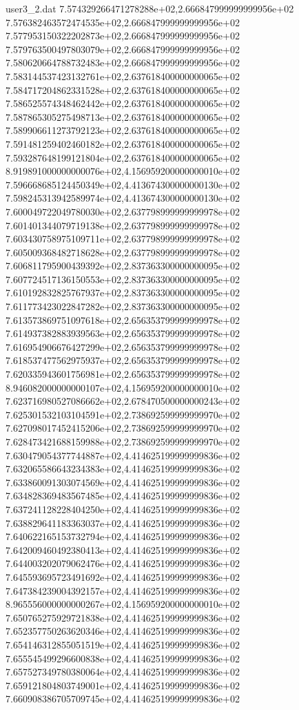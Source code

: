 \begin{filecontents}{user3_2.dat}
7.574329266471278288e+02,2.666847999999999956e+02
7.576382463572474535e+02,2.666847999999999956e+02
7.577953150322202873e+02,2.666847999999999956e+02
7.579763500497803079e+02,2.666847999999999956e+02
7.580620664788732483e+02,2.666847999999999956e+02
7.583144537423132761e+02,2.637618400000000065e+02
7.584717204862331528e+02,2.637618400000000065e+02
7.586525574348462442e+02,2.637618400000000065e+02
7.587865305275498713e+02,2.637618400000000065e+02
7.589906611273792123e+02,2.637618400000000065e+02
7.591481259402460182e+02,2.637618400000000065e+02
7.593287648199121804e+02,2.637618400000000065e+02
8.919891000000000076e+02,4.156959200000000010e+02
7.596668685124450349e+02,4.413674300000000130e+02
7.598245313942589974e+02,4.413674300000000130e+02
7.600049722049780030e+02,2.637798999999999978e+02
7.601401344079719138e+02,2.637798999999999978e+02
7.603430758975109711e+02,2.637798999999999978e+02
7.605009368482718628e+02,2.637798999999999978e+02
7.606811795900439392e+02,2.837363300000000095e+02
7.607724517136150553e+02,2.837363300000000095e+02
7.610192832825767937e+02,2.837363300000000095e+02
7.611773423022847282e+02,2.837363300000000095e+02
7.613573869751097618e+02,2.656353799999999978e+02
7.614937382883939563e+02,2.656353799999999978e+02
7.616954906676427299e+02,2.656353799999999978e+02
7.618537477562975937e+02,2.656353799999999978e+02
7.620335943601756981e+02,2.656353799999999978e+02
8.946082000000000107e+02,4.156959200000000010e+02
7.623716980527086662e+02,2.678470500000000243e+02
7.625301532103104591e+02,2.738692599999999970e+02
7.627098017452415206e+02,2.738692599999999970e+02
7.628473421688159988e+02,2.738692599999999970e+02
7.630479054377744887e+02,4.414625199999999836e+02
7.632065586643234383e+02,4.414625199999999836e+02
7.633860091303074569e+02,4.414625199999999836e+02
7.634828369483567485e+02,4.414625199999999836e+02
7.637241128228404250e+02,4.414625199999999836e+02
7.638829641183363037e+02,4.414625199999999836e+02
7.640622165153732794e+02,4.414625199999999836e+02
7.642009460492380413e+02,4.414625199999999836e+02
7.644003202079062476e+02,4.414625199999999836e+02
7.645593695723491692e+02,4.414625199999999836e+02
7.647384239004392157e+02,4.414625199999999836e+02
8.965556000000000267e+02,4.156959200000000010e+02
7.650765275929721838e+02,4.414625199999999836e+02
7.652357750263620346e+02,4.414625199999999836e+02
7.654146312855051519e+02,4.414625199999999836e+02
7.655545499296600838e+02,4.414625199999999836e+02
7.657527349780380064e+02,4.414625199999999836e+02
7.659121804803749001e+02,4.414625199999999836e+02
7.660908386705709745e+02,4.414625199999999836e+02

\end{filecontents}
